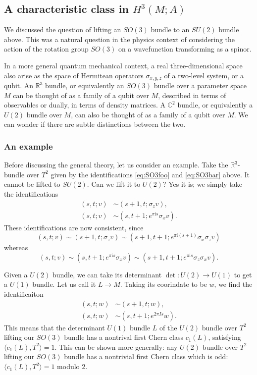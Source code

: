 \documentclass[12pt]{article}
\numberwithin{equation}{section}
\numberwithin{figure}{section}
\theoremstyle{remark}
\def\bC{\mathbb{C}}
\def\bR{\mathbb{R}}
\def\I{\mathrm{i}}
\begin{document}
\subsection{A characteristic class in $H^3(M;A)$}

We discussed the question of lifting an $SO(3)$ bundle to an $SU(2)$ bundle above.
This was a natural question in the physics context of considering 
the action of the rotation group $SO(3)$ on a wavefunction transforming as a spinor.

In a more general quantum mechanical context, a real three-dimensional space
also arise as the space of Hermitean operators $\sigma_{x,y,z}$
of a two-level system, or a qubit.
An $\bR^3$ bundle, or equivalently an $SO(3)$ bundle over a parameter space $M$
can be thought of as a family of a qubit over $M$,
described in terms of observables or dually, in terms of density matrices. 
A $\bC^2$ bundle, or equivalently a $U(2)$ bundle over $M$, 
can also be thought of as a family of a qubit over $M$.
We can wonder if there are subtle distinctions between the two.

\subsubsection{An example}

Before discussing the general theory, let us consider an example.
Take the $\bR^3$-bundle over $T^2$ given by the identifications \eqref{eq:SO3foo} and \eqref{eq:SO3bar} above.
It cannot be lifted to $SU(2)$. Can we lift it to $U(2)$?
Yes it is; we simply take the identifications \begin{align}
  (s,t;v) &\sim (s+1,t;\sigma_z v),\\
  (s,t;v) &\sim (s,t+1;e^{\pi \I s}\sigma_x v).
\end{align}
These identifications are now consistent, since \begin{equation}
  (s,t;v)\sim (s+1,t;\sigma_z v)\sim (s+1,t+1;e^{\pi \I (s+1)}\sigma_x\sigma_z v)
\end{equation} whereas \begin{equation}
  (s,t;v)\sim (s,t+1;e^{\pi \I s}\sigma_x v)\sim (s+1,t+1;e^{\pi \I s}\sigma_z\sigma_x v).
\end{equation}

Given a $U(2)$ bundle, we can take its determinant $\det:U(2)\to U(1)$ to get a $U(1)$ bundle. 
Let us call it $L\to M$.
Taking its coorindate to be $w$, we find the identificaiton \begin{align}
  (s,t;w) &\sim (s+1,t;w),\\
  (s,t;w) &\sim (s,t+1;e^{2\pi I s}w).
\end{align}
This means that the determinant $U(1)$ bundle $L$ of the $U(2)$ bundle over $T^2$
lifting our $SO(3)$ bundle has a nontrival first Chern class $c_1(L)$,
satisfying $\langle c_1(L),T^2\rangle=1$.
This can be shown more generally:
any $U(2)$ bundle over $T^2$ lifting our $SO(3)$ bundle 
has a nontrivial first Chern class which is odd: $\langle c_1(L),T^2\rangle=1$ modulo 2.
\end{document}
